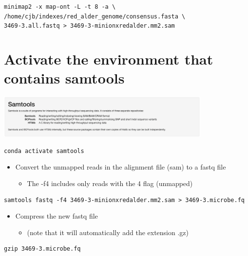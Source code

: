 \documentclass[
]{book}
\providecommand{\tightlist}{%
  \setlength{\itemsep}{0pt}\setlength{\parskip}{0pt}}
\begin{document}
\begin{verbatim}
minimap2 -x map-ont -L -t 8 -a \
/home/cjb/indexes/red_alder_genome/consensus.fasta \
3469-3.all.fastq > 3469-3-minionxredalder.mm2.sam
\end{verbatim}

\hypertarget{activate-the-environment-that-contains-samtools}{%
\section{Activate the environment that contains samtools}\label{activate-the-environment-that-contains-samtools}}

\includegraphics[width=0.8\textwidth,height=\textheight]{Figures/samtools.png}

\begin{verbatim}
conda activate samtools
\end{verbatim}

\begin{itemize}
\tightlist
\item
  Convert the unmapped reads in the alignment file (sam) to a fastq file

  \begin{itemize}
  \tightlist
  \item
    The -f4 includes only reads with the 4 flag (unmapped)
  \end{itemize}
\end{itemize}

\begin{verbatim}
samtools fastq -f4 3469-3-minionxredalder.mm2.sam > 3469-3.microbe.fq
\end{verbatim}

\begin{itemize}
\tightlist
\item
  Compress the new fastq file

  \begin{itemize}
  \tightlist
  \item
    (note that it will automatically add the extension .gz)
  \end{itemize}
\end{itemize}

\begin{verbatim}
gzip 3469-3.microbe.fq
\end{verbatim}
\end{document}
